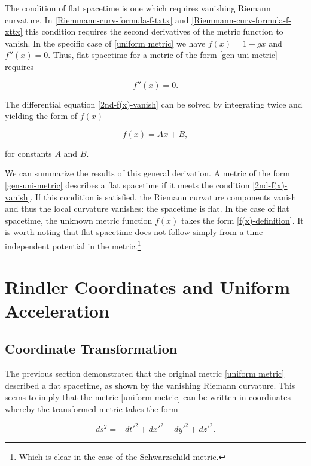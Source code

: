 \documentclass[11pt]{article}
\begin{document}
The condition of flat spacetime is one which requires vanishing Riemann curvature. In \eqref{Riemmann-curv-formula-f-txtx} and \eqref{Riemmann-curv-formula-f-xttx} this condition requires the second derivatives of the metric function to vanish. In the specific case of \eqref{uniform metric} we have $f(x) = 1 + gx$ and $f''(x) = 0$. Thus, flat spacetime for a metric of the form \eqref{gen-uni-metric} requires

\begin{equation}
    \label{2nd-f(x)-vanish}
    f''(x) = 0.
\end{equation}

The differential equation \eqref{2nd-f(x)-vanish} can be solved by integrating twice and yielding the form of $f(x)$

\begin{equation}
    \label{f(x)-definition}
    f(x) = Ax + B,
\end{equation}

for constants $A$ and $B$.

We can summarize the results of this general derivation. A metric of the form \eqref{gen-uni-metric} describes a flat spacetime if it meets the condition \eqref{2nd-f(x)-vanish}. If this condition is satisfied, the Riemann curvature components vanish and thus the local curvature vanishes: the spacetime is flat. In the case of flat spacetime, the unknown metric function $f(x)$ takes the form \eqref{f(x)-definition}. It is worth noting that flat spacetime does not follow simply from a time-independent potential in the metric.\footnote{Which is clear in the case of the Schwarzschild metric.}

\section{Rindler Coordinates and Uniform Acceleration}

\subsection{Coordinate Transformation}

The previous section demonstrated that the original metric \eqref{uniform metric} described a flat spacetime, as shown by the vanishing Riemann curvature. This seems to imply that the metric \eqref{uniform metric} can be written in coordinates whereby the transformed metric takes the form

\begin{equation}
    \label{flat-space-metric}
    ds^2 = -dt'^2 + dx'^2 + dy'^2 + dz'^2.
\end{equation}
\end{document}
